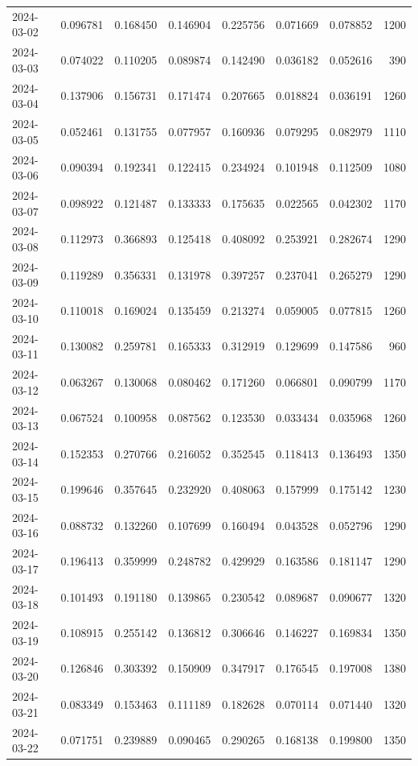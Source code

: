 \begin{tabular}{lrrrrrrr}
2024-03-02 & 0.096781 & 0.168450 & 0.146904 & 0.225756 & 0.071669 & 0.078852 & 1200 \\
2024-03-03 & 0.074022 & 0.110205 & 0.089874 & 0.142490 & 0.036182 & 0.052616 & 390 \\
2024-03-04 & 0.137906 & 0.156731 & 0.171474 & 0.207665 & 0.018824 & 0.036191 & 1260 \\
2024-03-05 & 0.052461 & 0.131755 & 0.077957 & 0.160936 & 0.079295 & 0.082979 & 1110 \\
2024-03-06 & 0.090394 & 0.192341 & 0.122415 & 0.234924 & 0.101948 & 0.112509 & 1080 \\
2024-03-07 & 0.098922 & 0.121487 & 0.133333 & 0.175635 & 0.022565 & 0.042302 & 1170 \\
2024-03-08 & 0.112973 & 0.366893 & 0.125418 & 0.408092 & 0.253921 & 0.282674 & 1290 \\
2024-03-09 & 0.119289 & 0.356331 & 0.131978 & 0.397257 & 0.237041 & 0.265279 & 1290 \\
2024-03-10 & 0.110018 & 0.169024 & 0.135459 & 0.213274 & 0.059005 & 0.077815 & 1260 \\
2024-03-11 & 0.130082 & 0.259781 & 0.165333 & 0.312919 & 0.129699 & 0.147586 & 960 \\
2024-03-12 & 0.063267 & 0.130068 & 0.080462 & 0.171260 & 0.066801 & 0.090799 & 1170 \\
2024-03-13 & 0.067524 & 0.100958 & 0.087562 & 0.123530 & 0.033434 & 0.035968 & 1260 \\
2024-03-14 & 0.152353 & 0.270766 & 0.216052 & 0.352545 & 0.118413 & 0.136493 & 1350 \\
2024-03-15 & 0.199646 & 0.357645 & 0.232920 & 0.408063 & 0.157999 & 0.175142 & 1230 \\
2024-03-16 & 0.088732 & 0.132260 & 0.107699 & 0.160494 & 0.043528 & 0.052796 & 1290 \\
2024-03-17 & 0.196413 & 0.359999 & 0.248782 & 0.429929 & 0.163586 & 0.181147 & 1290 \\
2024-03-18 & 0.101493 & 0.191180 & 0.139865 & 0.230542 & 0.089687 & 0.090677 & 1320 \\
2024-03-19 & 0.108915 & 0.255142 & 0.136812 & 0.306646 & 0.146227 & 0.169834 & 1350 \\
2024-03-20 & 0.126846 & 0.303392 & 0.150909 & 0.347917 & 0.176545 & 0.197008 & 1380 \\
2024-03-21 & 0.083349 & 0.153463 & 0.111189 & 0.182628 & 0.070114 & 0.071440 & 1320 \\
2024-03-22 & 0.071751 & 0.239889 & 0.090465 & 0.290265 & 0.168138 & 0.199800 & 1350 \\

\end{tabular}
